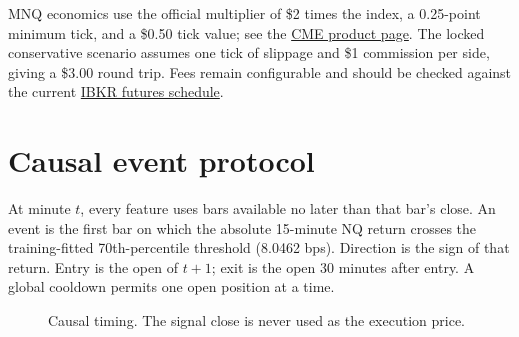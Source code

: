 \documentclass[10pt]{article}
\begin{document}
MNQ economics use the official multiplier of \$2 times the index, a 0.25-point minimum tick, and a \$0.50 tick value; see the \href{https://www.cmegroup.com/markets/equities/nasdaq/micro-e-mini-nasdaq-100.html}{CME product page}. The locked conservative scenario assumes one tick of slippage and \$1 commission per side, giving a \$3.00 round trip. Fees remain configurable and should be checked against the current \href{https://www.interactivebrokers.com/en/pricing/commissions-futures.php}{IBKR futures schedule}.

\newpage
\thispagestyle{fancy}
\section{Causal event protocol}
At minute $t$, every feature uses bars available no later than that bar's close. An event is the first bar on which the absolute 15-minute NQ return crosses the training-fitted 70th-percentile threshold (8.0462 bps). Direction is the sign of that return. Entry is the open of $t+1$; exit is the open 30 minutes after entry. A global cooldown permits one open position at a time.

\begin{figure}[ht]
\centering
{}
\caption{Causal timing. The signal close is never used as the execution price.}
\end{figure}
\end{document}
